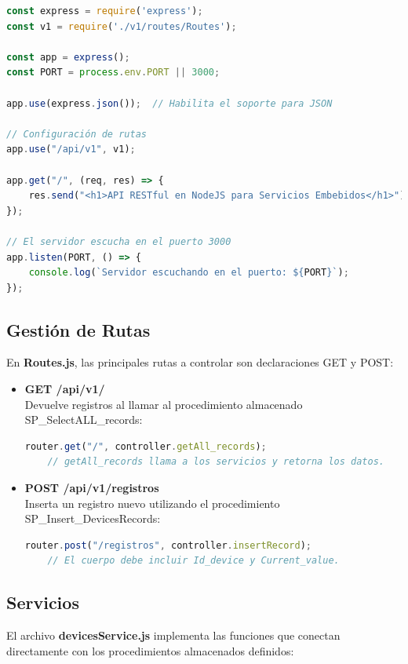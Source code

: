 \documentclass[12pt]{article}
\begin{document}
\begin{lstlisting}[language=JavaScript]
const express = require('express');
const v1 = require('./v1/routes/Routes');

const app = express();
const PORT = process.env.PORT || 3000;

app.use(express.json());  // Habilita el soporte para JSON

// Configuración de rutas
app.use("/api/v1", v1);

app.get("/", (req, res) => {
    res.send("<h1>API RESTful en NodeJS para Servicios Embebidos</h1>")
});

// El servidor escucha en el puerto 3000
app.listen(PORT, () => {
    console.log(`Servidor escuchando en el puerto: ${PORT}`);
});
\end{lstlisting}

\subsection{Gestión de Rutas}
En \textbf{Routes.js}, las principales rutas a controlar son declaraciones GET y POST:

\begin{itemize}
    \item \textbf{GET /api/v1/} \\
    Devuelve registros al llamar al procedimiento almacenado SP\_SelectALL\_records:
    \begin{lstlisting}[language=JavaScript]
    router.get("/", controller.getAll_records);
    // getAll_records llama a los servicios y retorna los datos.
    \end{lstlisting}
    
    \item \textbf{POST /api/v1/registros} \\
    Inserta un registro nuevo utilizando el procedimiento SP\_Insert\_DevicesRecords:
    \begin{lstlisting}[language=JavaScript]
    router.post("/registros", controller.insertRecord);
    // El cuerpo debe incluir Id_device y Current_value.
    \end{lstlisting}
\end{itemize}

\subsection{Servicios}
El archivo \textbf{devicesService.js} implementa las funciones que conectan directamente con los procedimientos almacenados definidos:
\end{document}
